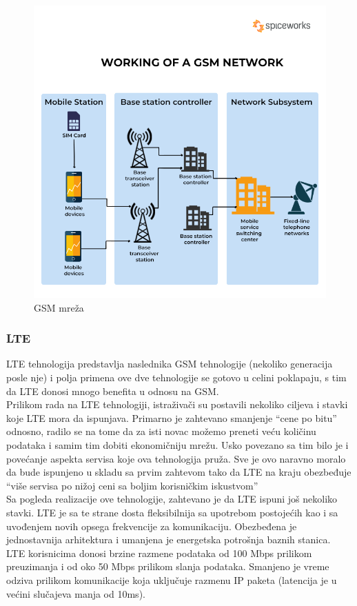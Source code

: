 \documentclass[a4paper]{article}
\begin{document}
\begin{figure}[!ht]
\begin{center}
\includegraphics[scale=0.35]{GSM.png}
\end{center}
\caption{GSM mreža \cite{GSM}}
\label{fig:GSM}
\end{figure}
\newpage
        \subsubsection{LTE}
LTE tehnologija predstavlja naslednika GSM tehnologije (nekoliko generacija posle nje) i polja primena ove dve tehnologije se gotovo u celini poklapaju, s tim da LTE donosi mnogo benefita u odnosu na GSM.\\
Prilikom rada na LTE tehnologiji, istraživači su postavili nekoliko ciljeva i stavki koje LTE mora da ispunjava. Primarno je zahtevano smanjenje “cene po bitu” odnosno, radilo se na tome da za isti novac možemo preneti veću količinu podataka i samim tim dobiti ekonomičniju mrežu. Usko povezano sa tim bilo je i povećanje aspekta servisa koje ova tehnologija pruža. Sve je ovo naravno moralo da bude ispunjeno u skladu sa prvim zahtevom tako da LTE na kraju obezbeđuje “više servisa po nižoj ceni sa boljim korisničkim iskustvom”\\
Sa pogleda realizacije ove tehnologije, zahtevano je da LTE ispuni još nekoliko stavki. LTE je sa te strane dosta fleksibilnija sa upotrebom postojećih kao i sa uvođenjem novih opsega frekvencije za komunikaciju. Obezbeđena je jednostavnija arhitektura i umanjena je energetska potrošnja baznih stanica.\\
LTE korisnicima donosi brzine razmene podataka od 100 Mbps prilikom preuzimanja i od oko 50 Mbps prilikom slanja podataka. Smanjeno je vreme odziva prilikom komunikacije koja uključuje razmenu IP paketa (latencija je u većini slučajeva manja od 10ms).
\end{document}
